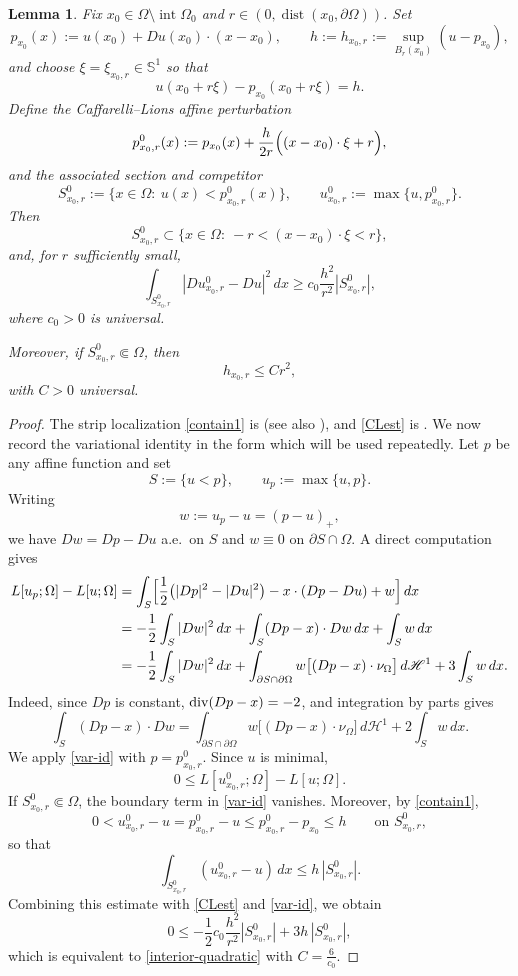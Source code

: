 \documentclass[reqno,11pt]{amsart}
\makeatletter
\def\dist{{\mathop\mathrm{dist}}}
\newtheorem{lem}[thm]{Lemma}%
\numberwithin{equation}{section}
\theoremstyle{remark}
\makeatother
\begin{document}
\begin{lem}\label{lem:interior-perturb}
Fix $x_0\in \Omega\setminus \operatorname{int}\Omega_0$ and $r \in (0, \dist(x_0,\partial\Omega))$.
Set
\[
p_{x_0}(x):=u(x_0)+Du(x_0)\cdot (x-x_0),
\qquad
h:=h_{x_0,r}:=\sup_{B_r(x_0)}(u-p_{x_0}),
\]
and choose $\xi=\xi_{x_0,r}\in \mathbb S^1$ so that
\[
u(x_0+r\xi)-p_{x_0}(x_0+r\xi)=h.
\]
Define the Caffarelli--Lions affine perturbation
\[
p_{x_0,r}^0(x):=p_{x_0}(x)+\frac{h}{2r}\Bigl((x-x_0)\cdot \xi+r\Bigr),
\]
and the associated section and competitor
\[
S_{x_0,r}^0:=\{x\in\Omega:\ u(x)<p_{x_0,r}^0(x)\},
\qquad
u_{x_0,r}^0:=\max\{u,p_{x_0,r}^0\}.
\]
Then
\begin{equation}\label{contain1}
S_{x_0,r}^0\subset \{x\in\Omega:\ -r<(x-x_0)\cdot \xi<r\},
\end{equation}
and, for $r$ sufficiently small,
\begin{equation}\label{CLest}
\int_{S_{x_0,r}^0} |Du_{x_0,r}^0 -Du|^2\,dx\ge c_0\frac{h^2}{r^2}|S_{x_0,r}^0|,
\end{equation}
where $c_0>0$ is universal.

Moreover, if $S_{x_0,r}^0\Subset\Omega$, then
\begin{equation}\label{interior-quadratic}
h_{x_0,r}\le C r^2,
\end{equation}
with $C>0$ universal.
\end{lem}

\begin{proof}
The strip localization \eqref{contain1} is \cite[Eq.~(32)]{MRZ20252}
(see also \cite{CL2006}), and \eqref{CLest} is
\cite[Eq.~(41)]{MRZ20252}.
We now record the variational identity in the form which will be used repeatedly.
Let $p$ be any affine function and set
\[
S:=\{u<p\},
\qquad
u_p:=\max\{u,p\}.
\]
Writing
\[
w:=u_p-u=(p-u)_+,
\]
we have $Dw=Dp-Du$ a.e.\ on $S$ and $w\equiv 0$ on $\partial S\cap\Omega$.
A direct computation gives
\begin{align}
L[u_p;\Omega]-L[u;\Omega]
&=\int_S\Bigl[\frac12\bigl(|Dp|^2-|Du|^2\bigr)-x\cdot(Dp-Du)+w\Bigr]\,dx \nonumber\\
&=-\frac12\int_S|Dw|^2\,dx+\int_S (Dp-x)\cdot Dw\,dx+\int_S w\,dx \nonumber\\
&=-\frac12\int_S|Dw|^2\,dx
+\int_{\partial S\cap\partial\Omega} w\bigl[(Dp-x)\cdot\nu_\Omega\bigr]\,d\mathscr H^1
+3\int_S w\,dx. \label{var-id}
\end{align}
Indeed, since $Dp$ is constant, ${\rm div}(Dp-x)=-2$, and integration by parts gives
\[
\int_S (Dp-x)\cdot Dw
=
\int_{\partial S\cap\partial\Omega} w\bigl[(Dp-x)\cdot\nu_\Omega\bigr]\,d\mathscr H^1
+2\int_S w\,dx.
\]
We apply \eqref{var-id} with $p=p_{x_0,r}^0$. Since $u$ is minimal,
\[
0\le L[u_{x_0,r}^0;\Omega]-L[u;\Omega].
\]
If $S_{x_0,r}^0\Subset\Omega$, the boundary term in \eqref{var-id} vanishes.
Moreover, by \eqref{contain1},
\[
0<u_{x_0,r}^0-u=p_{x_0,r}^0-u\le p_{x_0,r}^0-p_{x_0}\le h
\qquad\text{on }S_{x_0,r}^0,
\]
so that
\[
\int_{S_{x_0,r}^0}(u_{x_0,r}^0-u)\,dx\le h\,|S_{x_0,r}^0|.
\]
Combining this estimate with \eqref{CLest} and \eqref{var-id}, we obtain
\[
0\le
-\frac12c_0\frac{h^2}{r^2}|S_{x_0,r}^0|
+3h\,|S_{x_0,r}^0|,
\]
which is equivalent to \eqref{interior-quadratic} with $C=\frac{6}{c_0}$.
\end{proof}
\end{document}
